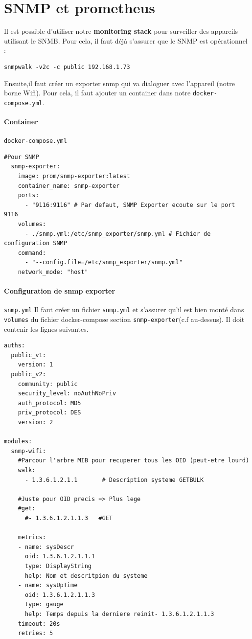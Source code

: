 \documentclass[french, 12pt]{article}%
\begin{document}
\section{SNMP et prometheus}

Il est possible d'utiliser notre \textbf{monitoring stack} pour surveiller des appareils utilisant le SNMB. Pour cela, il faut déjà s'assurer que le SNMP est opérationnel : 

\begin{lstlisting}[style=commande] 
snmpwalk -v2c -c public 192.168.1.73
\end{lstlisting} 

Ensuite,il faut créer un exporter snmp qui va dialoguer avec l'appareil (notre borne Wifi). Pour cela, il faut ajouter un container dans notre \verb?docker-compose.yml?.

\paragraph{Container } \verb?docker-compose.yml?

\begin{lstlisting}[style=commande] 
#Pour SNMP	
  snmp-exporter:
    image: prom/snmp-exporter:latest
    container_name: snmp-exporter
    ports:
      - "9116:9116" # Par defaut, SNMP Exporter ecoute sur le port 9116
    volumes:
      - ./snmp.yml:/etc/snmp_exporter/snmp.yml # Fichier de configuration SNMP
    command:
      - "--config.file=/etc/snmp_exporter/snmp.yml"
    network_mode: "host"
\end{lstlisting} 


\paragraph{Configuration de snmp exporter } \verb?snmp.yml?
Il faut créer un fichier \verb?snmp.yml? et s'assurer qu'il est bien monté dans \verb?volumes? du fichier docker-compose section \verb?snmp-exporter?(c.f au-dessus).  Il doit contenir les lignes suivantes.

\begin{lstlisting}[style=commande] 
auths:
  public_v1:
    version: 1
  public_v2:
    community: public
    security_level: noAuthNoPriv
    auth_protocol: MD5
    priv_protocol: DES
    version: 2

modules:
  snmp-wifi:
    #Parcour l'arbre MIB pour recuperer tous les OID (peut-etre lourd)
    walk:
      - 1.3.6.1.2.1.1       # Description systeme GETBULK
      
    #Juste pour OID precis => Plus lege
    #get:
      #- 1.3.6.1.2.1.1.3   #GET
    
    metrics:
    - name: sysDescr
      oid: 1.3.6.1.2.1.1.1
      type: DisplayString
      help: Nom et descritpion du systeme
    - name: sysUpTime
      oid: 1.3.6.1.2.1.1.3
      type: gauge
      help: Temps depuis la derniere reinit- 1.3.6.1.2.1.1.3  
    timeout: 20s
    retries: 5
\end{lstlisting} 
 
\end{document}
